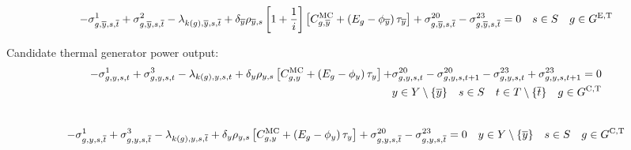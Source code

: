 \documentclass{article}
\begin{document}
\begin{equation}
-\dMinPowerOutput[\iGenerator,\iYearTerminal,\iScenario,\iIntervalTerminal] + \dMaxPowerOutputExistingThermal[\iGenerator,\iYearTerminal,\iScenario,\iIntervalTerminal] - \dPowerBalance[k(\iGenerator),\iYearTerminal,\iScenario,\iIntervalTerminal] + \cDiscountRate[\iYearTerminal] \cScenarioDuration[\iYearTerminal,\iScenario] \left[1 + \frac{1}{\cInterestRate}\right] \left[\cMarginalCost[\iGenerator,\iYearTerminal] + \left(\cEmissionsIntensity - \vBaseline[\iYearTerminal]\right)\vPermitPrice[\iYearTerminal] \right] + \dRampRateUp[\iGenerator,\iYearTerminal,\iScenario,\iIntervalTerminal] - \dRampRateDown[\iGenerator,\iYearTerminal,\iScenario,\iIntervalTerminal] = 0 \quad \iScenario \in \sScenarios \quad \iGenerator \in \sGeneratorsExistingThermal
\end{equation}

Candidate thermal generator power output:
\begin{align}
-\dMinPowerOutput + \dMaxPowerOutputCandidateThermal 
- \dPowerBalance[k(\iGenerator),\iYear,\iScenario,\iInterval] + \cDiscountRate \cScenarioDuration \left[\cMarginalCost + \left(\cEmissionsIntensity - \vBaseline\right)\vPermitPrice \right] + & \dRampRateUp - \dRampRateUp[\iGenerator,\iYear,\iScenario,\iInterval + 1] - \dRampRateDown + \dRampRateDown[\iGenerator,\iYear,\iScenario,\iInterval + 1] = 0 \nonumber\\
& \iYear \in \sYears \setminus \{\iYearTerminal\} \quad \iScenario \in \sScenarios \quad \iInterval \in \sIntervals \setminus \{\iIntervalTerminal\} \quad \iGenerator \in \sGeneratorsCandidateThermal \\\nonumber
\end{align}

\begin{equation}
-\dMinPowerOutput[\iGenerator,\iYear,\iScenario,\iIntervalTerminal] + \dMaxPowerOutputCandidateThermal[\iGenerator,\iYear,\iScenario,\iIntervalTerminal] 
- \dPowerBalance[k(\iGenerator),\iYear,\iScenario,\iIntervalTerminal] + \cDiscountRate \cScenarioDuration \left[\cMarginalCost + \left(\cEmissionsIntensity - \vBaseline\right)\vPermitPrice \right] + \dRampRateUp[\iGenerator,\iYear,\iScenario,\iIntervalTerminal] - \dRampRateDown[\iGenerator,\iYear,\iScenario,\iIntervalTerminal] = 0 \quad \iYear \in \sYears \setminus \{\iYearTerminal\} \quad \iScenario \in \sScenarios \quad \iGenerator \in \sGeneratorsCandidateThermal\\
\end{equation}
\end{document}
